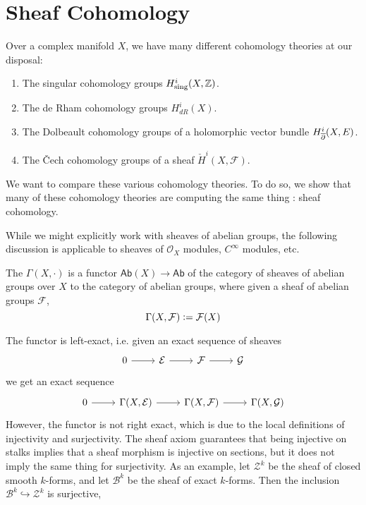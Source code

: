 %
\section{Sheaf Cohomology}
%
Over a complex manifold $X$, we have many different cohomology theories at our disposal:
\begin{enumerate}
  \item The singular cohomology groups $H^i_{\text{sing}}(X,\mathbb{Z})$.
  \item The de Rham cohomology groups $H^i_{dR}(X)$.
  \item The Dolbeault cohomology groups of a holomorphic vector bundle
  $H^i_{\overline{\partial}}(X, E)$.
  \item The \v{C}ech cohomology groups of a sheaf $\check{H}^i(X,\mathcal{F})$.
\end{enumerate}
%
We want to compare these various cohomology theories. To do so, we show that many of
these cohomology theories are computing the same thing : sheaf cohomology.
%
\begin{rem*}
While we might explicitly work with sheaves of abelian groups, the following discussion
is applicable to sheaves of $\mathcal{O}_X$ modules, $C^\infty$ modules, etc.
\end{rem*}
%
\begin{defn}
The  $\Gamma(X,\cdot)$ is a functor
$\mathsf{Ab}(X) \to \mathsf{Ab}$ of the category of sheaves of abelian groups over $X$ to
the category of abelian groups, where given a sheaf of abelian groups $\mathcal{F}$,
\[
\Gamma(X,\mathcal{F}) \vcentcolon= \mathcal{F}(X)
\]
\end{defn}
%
The functor is left-exact, i.e. given an exact sequence of sheaves
\[\begin{tikzcd}
0 \ar[r] & \mathcal{E} \ar[r] & \mathcal{F} \ar[r] & \mathcal{G}
\end{tikzcd}\]
we get an exact sequence
\[\begin{tikzcd}
0 \ar[r] & \Gamma(X,\mathcal{E}) \ar[r]
& \Gamma(X,\mathcal{F}) \ar[r] & \Gamma(X,\mathcal{G})
\end{tikzcd}\]
%
However, the functor is not right exact, which is due to the local definitions of
injectivity and surjectivity. The sheaf axiom guarantees that being injective on
stalks implies that a sheaf morphism is injective on sections, but it does not
imply the same thing for surjectivity. As an example, let $\mathcal{Z}^k$ be
the sheaf of closed smooth $k$-forms, and let $\mathcal{B}^k$ be the sheaf of exact
$k$-forms. Then the inclusion $\mathcal{B}^k \hookrightarrow \mathcal{Z}^k$ is surjective,
